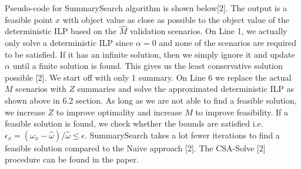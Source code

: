 \documentclass[a4paper,12pt]{article}
\begin{document}
Pseudo-code for SummarySearch algorithm is shown below[2]. The output is a feasible point $x$ with object value as close as possible to the object value of the deterministic ILP based on the $\hat{M}$ validation scenarios. On Line 1, we actually only solve a deterministic ILP since $\alpha = 0$ and none of the scenarios are required to be satisfied. If it has an infinite solution, then we simply ignore it and update $\alpha$ until a finite solution is found. This gives us the least conservative solution possible [2]. We start off with only 1 summary. On Line 6 we replace the actual $M$ scenarios with $Z$ summaries and solve the approximated deterministic ILP as shown above in 6.2 section. As long as we are not able to find a feasible solution, we increase $Z$ to improve optimality and increase $M$ to improve feasibility. If a feasible solution is found, we check whether the bounds are satisfied i.e. $\epsilon_x = (\omega_x - \hat{\omega})/\hat{\omega} \leq \epsilon$. SummarySearch takes a lot fewer iterations to find a feasible solution compared to the Naive approach [2]. The CSA-Solve [2] procedure can be found in the paper.
\\
\end{document}
